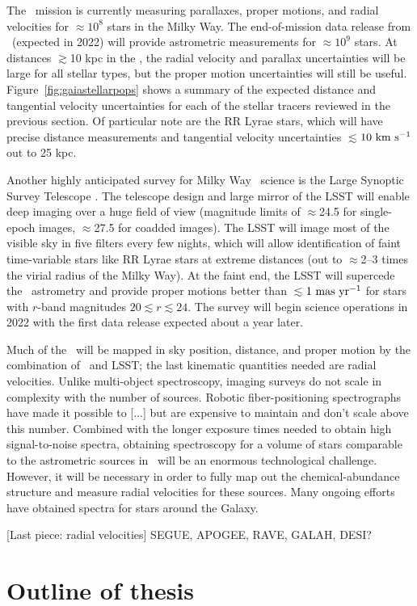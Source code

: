 The \gaia\ mission is currently measuring parallaxes, proper motions, and radial
velocities for $\approx$$10^{8}$ stars in the Milky Way. The end-of-mission data
release from \gaia\ (expected in 2022) will provide astrometric measurements for
$\approx$$10^{9}$ stars. At distances $\gtrsim$10 kpc in the \mwhalo, the radial
velocity and parallax uncertainties will be large for all stellar types, but the
proper motion uncertainties will still be useful.
Figure~\ref{fig:gaiastellarpops} shows a summary of the expected distance and
tangential velocity uncertainties for each of the stellar tracers reviewed in
the previous section. Of particular note are the RR Lyrae stars, which will have
precise distance measurements and tangential velocity uncertainties
$\lesssim$$10~\mathrm{km}~\mathrm{s}^{-1}$ out to 25 kpc.

Another highly anticipated survey for Milky Way \mwhalo\ science is the Large
Synoptic Survey Telescope \citep[LSST;][]{lsstsciencebook}. The telescope design
and large mirror of the LSST will enable deep imaging over a huge field of view
(magnitude limits of $\approx$24.5 for single-epoch images, $\approx$27.5 for
coadded images). The LSST will image most of the visible sky in five filters
every few nights, which will allow identification of faint time-variable stars
like RR Lyrae stars at extreme distances (out to $\approx$2--3 times the virial
radius of the Milky Way). At the faint end, the LSST will supercede the \gaia\
astrometry and provide proper motions better than $\lesssim$$1~{\rm mas}~{\rm
yr}^{-1}$ for stars with $r$-band magnitudes $20 \lesssim r \lesssim 24$. The
survey will begin science operations in 2022 with the first data release
expected about a year later.

Much of the \mwhalo\ will be mapped in sky position, distance, and proper motion
by the combination of \gaia\ and LSST; the last kinematic quantities needed are
radial velocities. Unlike multi-object spectroscopy, imaging surveys do not
scale in complexity with the number of sources. Robotic fiber-positioning
spectrographs have made it possible to [...] but are expensive to maintain and
don't scale above this number. Combined with the longer exposure times needed to
obtain high signal-to-noise spectra, obtaining spectroscopy for a volume of
stars comparable to the astrometric sources in \gaia\ will be an enormous
technological challenge. However, it will be necessary in order to fully map out
the chemical-abundance structure and measure radial velocities for these
sources. Many ongoing efforts \citep[e.g.,][]{todo, apogee, galah, rave, ...}
have obtained spectra for stars around the Galaxy. \todo{Future efforts like
DESI ...}

[Last piece: radial velocities]
SEGUE, APOGEE, RAVE, GALAH, DESI?

\section{Outline of thesis}

